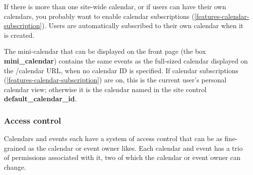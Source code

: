 If there is more than one site-wide calendar, or if users can have their own calendars, you probably want to enable calendar subscriptions (\ref{features-calendar-subscription}). Users are automatically subscribed to their own calendar when it is created.

The mini-calendar that can be displayed on the front page (the box {\bf mini\_calendar}) contains the same events as the full-sized calendar displayed on the /calendar URL, when no calendar ID is specified. If calendar subscriptions (\ref{features-calendar-subscription}) are on, this is the current user's personal calendar view; otherwise it is the calendar named in the site control {\bf default\_calendar\_id}.

\subsubsection{Access control}
\label{features-calendar-access}

Calendars and events each have a system of access control that can be as fine-grained as the calendar or event owner likes. Each calendar and event has a trio of permissions associated with it, two of which the calendar or event owner can change.

